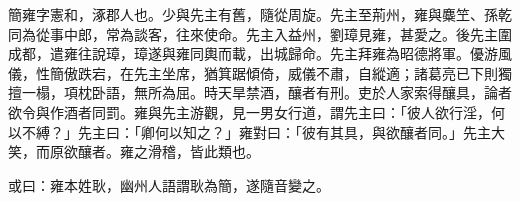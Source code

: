 
\begin{pinyinscope}
簡雍字憲和，涿郡人也。少與先主有舊，隨從周旋。先主至荊州，雍與麋笁、孫乾同為從事中郎，常為談客，往來使命。先主入益州，劉璋見雍，甚愛之。後先主圍成都，遣雍往說璋，璋遂與雍同輿而載，出城歸命。先主拜雍為昭德將軍。優游風儀，性簡傲跌宕，在先主坐席，猶箕踞傾倚，威儀不肅，自縱適；諸葛亮已下則獨擅一榻，項枕卧語，無所為屈。時天旱禁酒，釀者有刑。吏於人家索得釀具，論者欲令與作酒者同罰。雍與先主游觀，見一男女行道，謂先主曰：「彼人欲行淫，何以不縛？」先主曰：「卿何以知之？」雍對曰：「彼有其具，與欲釀者同。」先主大笑，而原欲釀者。雍之滑稽，皆此類也。

或曰：雍本姓耿，幽州人語謂耿為簡，遂隨音變之。


\end{pinyinscope}